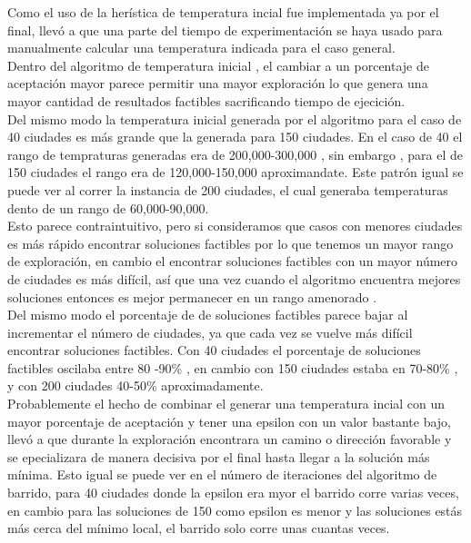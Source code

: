 \documentclass[a4paper]{article}
\begin{document}
Como el uso de la her\'istica de temperatura incial fue implementada ya por el final, llev\'o a que una parte del tiempo de experimentaci\'on se haya usado para manualmente calcular una temperatura indicada para el caso general.  \\

Dentro del algoritmo de temperatura inicial , el cambiar a un porcentaje de aceptaci\'on mayor parece permitir una mayor exploraci\'on lo que genera una mayor cantidad de resultados factibles sacrificando tiempo de ejecici\'on.\\

Del mismo modo la temperatura inicial generada por el algoritmo para el caso de 40 ciudades es m\'as grande que la generada para 150 ciudades. En el caso de 40  el rango de tempraturas generadas era de 200,000-300,000 , sin embargo , para el de 150 ciudades el rango era de 120,000-150,000 aproximandate. Este patr\'on igual se puede ver al correr la instancia de 200 ciudades, el cual generaba temperaturas dento de un rango de 60,000-90,000. \\


Esto parece contraintuitivo, pero si consideramos que  casos con menores ciudades es m\'as r\'apido encontrar soluciones factibles por lo que tenemos un mayor rango de exploraci\'on, en cambio el encontrar soluciones factibles con un mayor n\'umero de ciudades es m\'as dif\'icil, as\'i que una vez cuando el algoritmo encuentra mejores soluciones entonces es mejor permanecer en un rango amenorado .\\

Del mismo modo el porcentaje de de soluciones factibles parece bajar al incrementar el n\'umero de ciudades, ya que cada vez se vuelve m\'as dif\'icil encontrar soluciones factibles. Con 40 ciudades el porcentaje de soluciones factibles oscilaba entre 80 -90\% , en cambio con 150 ciudades estaba en 70-80\% , y con 200 ciudades 40-50\% aproximadamente.\\

Probablemente el hecho de combinar el generar una temperatura incial con un mayor porcentaje de aceptaci\'on y tener una epsilon con un valor bastante bajo, llev\'o a que durante la exploraci\'on encontrara un camino o direcci\'on  favorable y se epecializara de manera decisiva por el final hasta llegar a la soluci\'on m\'as m\'inima. Esto igual se puede ver en el n\'umero de iteraciones del algoritmo de barrido, para 40 ciudades donde la epsilon era myor el barrido corre varias veces, en cambio para las soluciones de 150 como epsilon es menor y las soluciones est\'as m\'as cerca del m\'inimo local, el barrido solo corre unas cuantas veces.
\end{document}
